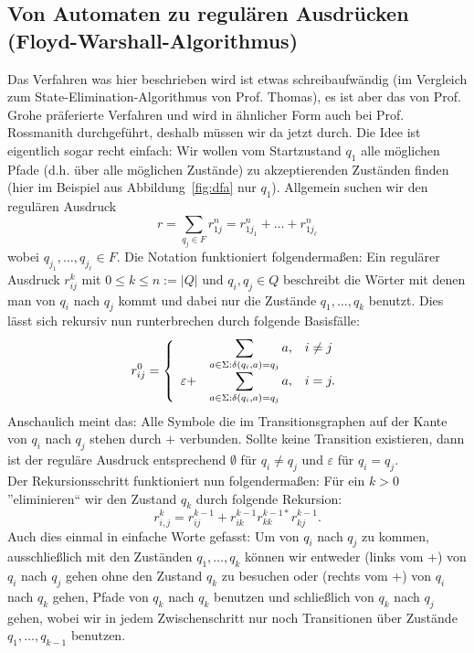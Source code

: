 \documentclass[11pt, a4paper]{article}
\begin{document}
\subsection*{Von Automaten zu regulären Ausdrücken (Floyd-Warshall-Algorithmus)}
Das Verfahren was hier beschrieben wird ist etwas schreibaufwändig (im Vergleich zum State-Elimination-Algorithmus von Prof. Thomas), es ist aber das von Prof. Grohe präferierte Verfahren und wird in ähnlicher Form auch bei Prof. Rossmanith durchgeführt, deshalb müssen wir da jetzt durch. Die Idee ist eigentlich sogar recht einfach: Wir wollen vom Startzustand \( q_1 \) alle möglichen Pfade (d.h. über alle möglichen Zustände) zu akzeptierenden Zuständen finden (hier im Beispiel aus Abbildung~\ref{fig:dfa} nur \( q_1 \)). Allgemein suchen wir den regulären Ausdruck
\[
	r = \sum_{q_j \in F} r_{1j}^n = r_{1j_1}^n + \ldots + r_{1j_\ell}^n
\]
wobei \( q_{j_1}, \ldots, q_{j_\ell} \in F \). Die Notation funktioniert folgendermaßen: Ein regulärer Ausdruck \( r_{ij}^k \) mit \( 0 \leq k \leq n := \left| Q \right| \) und \( q_i, q_j \in Q \) beschreibt die Wörter mit denen man von \( q_i \) nach \( q_j \) kommt und dabei nur die Zustände \( q_1, \ldots, q_k \) benutzt. Dies lässt sich rekursiv nun runterbrechen durch folgende Basisfälle:
\[
	r_{ij}^0 = \left\lbrace 
		\begin{array}{*3{>{\displaystyle}l}p{5cm}}
			\ &\sum_{a \in \Sigma: \delta(q_i, a) = q_j} a, & i \neq j\\
			\varepsilon + &\sum_{a \in \Sigma: \delta(q_i, a) = q_j} a, & i = j.
		\end{array}
	\right.	
\]
Anschaulich meint das: Alle Symbole die im Transitionsgraphen auf der Kante von \( q_i \) nach \( q_j \) stehen durch \( + \) verbunden. Sollte keine Transition existieren, dann ist der reguläre Ausdruck entsprechend \( \emptyset \) für \( q_i \neq q_j \) und \( \varepsilon \) für \( q_i = q_j \).\\
Der Rekursionsschritt funktioniert nun folgendermaßen: Für ein \( k > 0 \) ''eliminieren`` wir den Zustand \( q_k \) durch folgende Rekursion:
\[
	r_{i,j}^k = r_{ij}^{k-1} + r_{ik}^{k-1} r_{kk}^{k-1\ast} r_{kj}^{k-1}.
\]
Auch dies einmal in einfache Worte gefasst: Um von \( q_i \) nach \( q_j \) zu kommen, ausschließlich mit den Zuständen \( q_1, \ldots, q_k \) können wir entweder (links vom +) von \( q_i \) nach \( q_j \) gehen ohne den Zustand \( q_k \) zu besuchen oder (rechts vom +) von \( q_i \) nach \( q_k \) gehen, Pfade von \( q_k \) nach \( q_k \) benutzen und schließlich von \( q_k \) nach \( q_j \) gehen, wobei wir in jedem Zwischenschritt nur noch Transitionen über Zustände \( q_1, \ldots, q_{k-1} \) benutzen.\\
\end{document}
